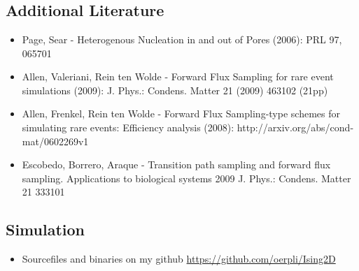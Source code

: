 \documentclass{beamer}
\begin{document}
\section{}
\subsection{Additional Literature}
\begin{frame}
\begin{itemize}
\item Page, Sear - Heterogenous Nucleation in and out of Pores (2006): PRL 97, 065701
\item Allen, Valeriani, Rein ten Wolde - Forward Flux Sampling for rare event simulations (2009): J. Phys.: Condens. Matter 21 (2009) 463102 (21pp)
\item Allen, Frenkel, Rein ten Wolde - Forward Flux Sampling-type schemes for simulating rare events: Efficiency analysis (2008): http://arxiv.org/abs/cond-mat/0602269v1
\item Escobedo, Borrero, Araque -  Transition path sampling and forward flux sampling. Applications to biological systems 2009 J. Phys.: Condens. Matter 21 333101
\end{itemize}
\end{frame}
\subsection{Simulation}
\begin{frame}
\begin{itemize}
\item Sourcefiles and binaries on my github \href{https://github.com/oerpli/Ising2D}{https://github.com/oerpli/Ising2D}
\end{itemize}
\end{frame}
\end{document}
